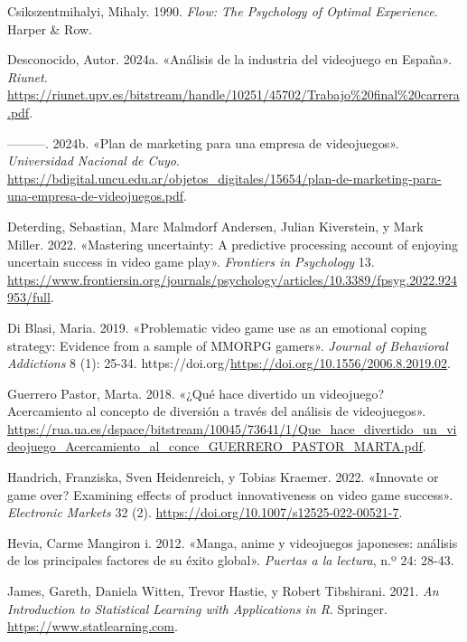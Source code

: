 \documentclass[
  letterpaper,
  DIV=11,
  numbers=noendperiod]{scrreprt}
\newlength{\cslhangindent}
\newenvironment{CSLReferences}[2] %
 {\begin{list}{}{%
  \setlength{\itemindent}{0pt}
  \setlength{\leftmargin}{0pt}
  \setlength{\parsep}{0pt}
  \ifodd #1
   \setlength{\leftmargin}{\cslhangindent}
   \setlength{\itemindent}{-1\cslhangindent}
  \fi
  \setlength{\itemsep}{#2\baselineskip}}}
 {\end{list}}
\begin{document}
\label{refs}
\begin{CSLReferences}{1}{0}
Csikszentmihalyi, Mihaly. 1990. \emph{Flow: The Psychology of Optimal
Experience}. Harper \& Row.

Desconocido, Autor. 2024a. {«Análisis de la industria del videojuego en
España»}. \emph{Riunet}.
\url{https://riunet.upv.es/bitstream/handle/10251/45702/Trabajo\%20final\%20carrera.pdf}.

---------. 2024b. {«Plan de marketing para una empresa de videojuegos»}.
\emph{Universidad Nacional de Cuyo}.
\url{https://bdigital.uncu.edu.ar/objetos_digitales/15654/plan-de-marketing-para-una-empresa-de-videojuegos.pdf}.

Deterding, Sebastian, Marc Malmdorf Andersen, Julian Kiverstein, y Mark
Miller. 2022. {«Mastering uncertainty: A predictive processing account
of enjoying uncertain success in video game play»}. \emph{Frontiers in
Psychology} 13.
\url{https://www.frontiersin.org/journals/psychology/articles/10.3389/fpsyg.2022.924953/full}.

Di Blasi, Maria. 2019. {«Problematic video game use as an emotional
coping strategy: Evidence from a sample of MMORPG gamers»}.
\emph{Journal of Behavioral Addictions} 8 (1): 25-34.
https://doi.org/\url{https://doi.org/10.1556/2006.8.2019.02}.

Guerrero Pastor, Marta. 2018. {«¿Qué hace divertido un videojuego?
Acercamiento al concepto de diversión a través del análisis de
videojuegos»}.
\url{https://rua.ua.es/dspace/bitstream/10045/73641/1/Que_hace_divertido_un_videojuego_Acercamiento_al_conce_GUERRERO_PASTOR_MARTA.pdf}.

Handrich, Franziska, Sven Heidenreich, y Tobias Kraemer. 2022.
{«Innovate or game over? Examining effects of product innovativeness on
video game success»}. \emph{Electronic Markets} 32 (2).
\url{https://doi.org/10.1007/s12525-022-00521-7}.

Hevia, Carme Mangiron i. 2012. {«Manga, anime y videojuegos japoneses:
análisis de los principales factores de su éxito global»}. \emph{Puertas
a la lectura}, n.º 24: 28-43.

James, Gareth, Daniela Witten, Trevor Hastie, y Robert Tibshirani. 2021.
\emph{An Introduction to Statistical Learning with Applications in R}.
Springer. \url{https://www.statlearning.com}.


\end{CSLReferences}
\end{document}
